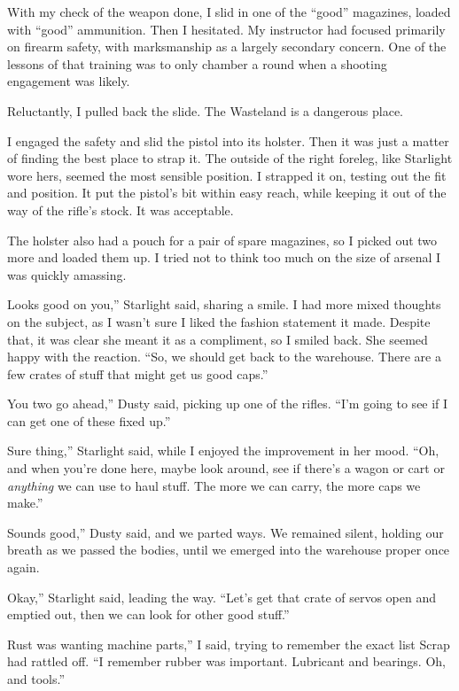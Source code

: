 With my check of the weapon done, I slid in one of the “good” magazines, loaded with “good” ammunition. Then I hesitated. My instructor had focused primarily on firearm safety, with marksmanship as a largely secondary concern. One of the lessons of that training was to only chamber a round when a shooting engagement was likely.

Reluctantly, I pulled back the slide. The Wasteland is a dangerous place.

I engaged the safety and slid the pistol into its holster. Then it was just a matter of finding the best place to strap it. The outside of the right foreleg, like Starlight wore hers, seemed the most sensible position. I strapped it on, testing out the fit and position. It put the pistol’s bit within easy reach, while keeping it out of the way of the rifle’s stock. It was acceptable.

The holster also had a pouch for a pair of spare magazines, so I picked out two more and loaded them up. I tried not to think too much on the size of arsenal I was quickly amassing.

\leavevmode{}Looks good on you,” Starlight said, sharing a smile. I had more mixed thoughts on the subject, as I wasn’t sure I liked the fashion statement it made. Despite that, it was clear she meant it as a compliment, so I smiled back. She seemed happy with the reaction. “So, we should get back to the warehouse. There are a few crates of stuff that might get us good caps.”

\leavevmode{}You two go ahead,” Dusty said, picking up one of the rifles. “I’m going to see if I can get one of these fixed up.”

\leavevmode{}Sure thing,” Starlight said, while I enjoyed the improvement in her mood. “Oh, and when you’re done here, maybe look around, see if there’s a wagon or cart or \textit{anything} we can use to haul stuff. The more we can carry, the more caps we make.”

\leavevmode{}Sounds good,” Dusty said, and we parted ways. We remained silent, holding our breath as we passed the bodies, until we emerged into the warehouse proper once again.

\leavevmode{}Okay,” Starlight said, leading the way. “Let’s get that crate of servos open and emptied out, then we can look for other good stuff.”

\leavevmode{}Rust was wanting machine parts,” I said, trying to remember the exact list Scrap had rattled off. “I remember rubber was important. Lubricant and bearings. Oh, and tools.”

